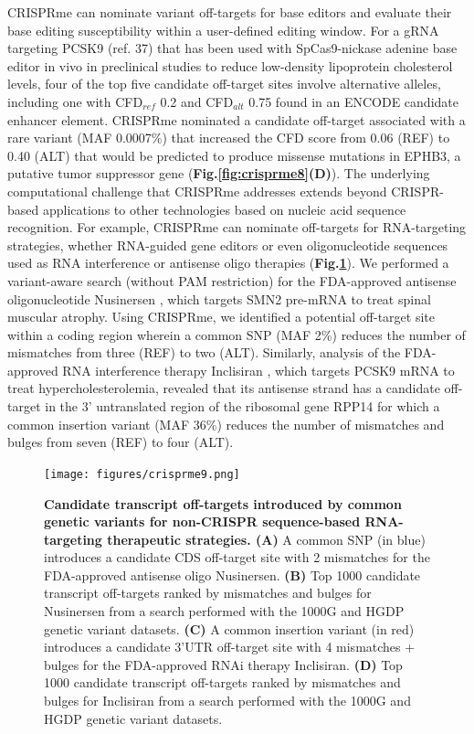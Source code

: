 \documentclass[a4paper, titlepage, openright]{book}
\newcommand{\crisprme}{CRISPRme\xspace}
\begin{document}
\crisprme can nominate variant off-targets for base editors and evaluate their base editing susceptibility within a user-defined editing window. For a gRNA targeting PCSK9 (ref. 37) that has been used with SpCas9-nickase adenine base editor in vivo in preclinical studies to reduce low-density lipoprotein cholesterol levels, four of the top five candidate off-target sites involve alternative alleles, including one with CFD$_{ref}$ 0.2 and CFD$_{alt}$ 0.75 found in an ENCODE candidate enhancer element. \crisprme nominated a candidate off-target associated with a rare variant (MAF 0.0007\%) that increased the CFD score from 0.06 (REF) to 0.40 (ALT) that would be predicted to produce missense mutations in EPHB3, a putative tumor suppressor gene (\textbf{Fig.\ref{fig:crisprme8}(D)}). The underlying computational challenge that \crisprme addresses extends beyond CRISPR-based applications to other technologies based on nucleic acid sequence recognition. For example, \crisprme can nominate off-targets for RNA-targeting strategies, whether RNA-guided gene editors or even oligonucleotide sequences used as RNA interference or antisense oligo therapies (\textbf{Fig.\ref{fig:crisprme9}}). We performed a variant-aware search (without PAM restriction) for the FDA-approved antisense oligonucleotide Nusinersen \citep{finkel2017nusinersen, mercuri2018nusinersen}, which targets SMN2 pre-mRNA to treat spinal muscular atrophy. Using \crisprme, we identified a potential off-target site within a coding region wherein a common SNP (MAF 2\%) reduces the number of mismatches from three (REF) to two (ALT). Similarly, analysis of the FDA-approved RNA interference therapy Inclisiran \citep{raal2020inclisiran}, which targets PCSK9 mRNA to treat hypercholesterolemia, revealed that its antisense strand has a candidate off-target in the 3' untranslated region of the ribosomal gene RPP14 for which a common insertion variant (MAF 36\%) reduces the number of mismatches and bulges from seven (REF) to four (ALT).
\begin{figure}
	\centering
	\texttt{[image: figures/crisprme9.png]}
	\caption[Candidate transcript off-targets introduced by common genetic variants for non-CRISPR sequence-based RNA-targeting therapeutic strategies]{\textbf{Candidate transcript off-targets introduced by common genetic variants for non-CRISPR sequence-based RNA-targeting therapeutic strategies. (A)} A common SNP (in blue) introduces a candidate CDS off-target site with 2 mismatches for the FDA-approved antisense oligo Nusinersen. \textbf{(B)} Top 1000 candidate transcript off-targets ranked by mismatches and bulges for Nusinersen from a search performed with the 1000G and HGDP genetic variant datasets. \textbf{(C)} A common insertion variant (in red) introduces a candidate 3’UTR off-target site with 4 mismatches + bulges for the FDA-approved RNAi therapy Inclisiran. \textbf{(D)} Top 1000 candidate transcript off-targets ranked by mismatches and bulges for Inclisiran from a search performed with the 1000G and HGDP genetic variant datasets.}
	\label{fig:crisprme9}
\end{figure} 
\end{document}
